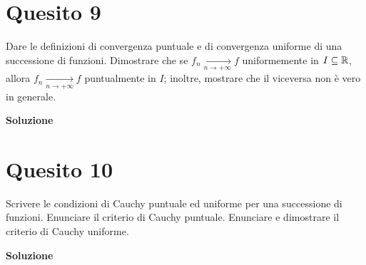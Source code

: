 \section*{Quesito 9}
Dare le definizioni di convergenza puntuale e di convergenza uniforme di una
successione di funzioni. Dimostrare che se $f_n \underset{n\to +\infty}{\longrightarrow} f$ uniformemente in 
$I\subseteq\mathbb{R}$, allora $f_n \underset{n\to +\infty}{\longrightarrow} f$ puntualmente in $I$;
inoltre, mostrare che il viceversa non è vero in generale.

\medskip
\begin{large}
\textbf{Soluzione}
\end{large}


\section*{Quesito 10}
Scrivere le condizioni di Cauchy puntuale ed uniforme per una successione
di funzioni. Enunciare il criterio di Cauchy puntuale. Enunciare e dimostrare il criterio
di Cauchy uniforme.

\medskip
\begin{large}
\textbf{Soluzione}
\end{large}
